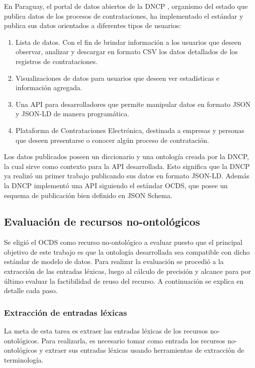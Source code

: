 En Paraguay,  el portal de datos abiertos de la DNCP \cite{DatosAbiDNCP:online}, organismo del estado que publica datos de los procesos de contrataciones, ha implementado el estándar y publica sus datos orientados a diferentes tipos de usuarios:


\begin{enumerate}
    \item Lista de datos. Con el fin de brindar información a los usuarios que deseen observar, analizar y descargar en formato CSV los datos detallados de los registros de contrataciones.
    \item Visualizaciones de datos para usuarios que deseen ver estadísticas e información agregada.
    \item Una API para desarrolladores que permite manipular datos en formato JSON y JSON-LD de manera programática.
    \item Plataforma de Contrataciones Electrónica, destinada a empresas y personas que deseen presentarse o conocer algún proceso de contratación.
\end{enumerate}

Los datos publicados poseen un diccionario y una ontología creada por la DNCP, la cual sirve como contexto para la API desarrollada. Esto significa que la DNCP ya realizó un primer trabajo publicando sus datos en formato JSON-LD. Además la DNCP implementó una API siguiendo el estándar OCDS, que posee un esquema de publicación bien definido en JSON Schema.


\subsection{Evaluación de recursos no-ontológicos}
Se eligió el OCDS como recurso no-ontológico a evaluar puesto que el principal objetivo de este trabajo es que la ontología desarrollada sea compatible con dicho estándar de modelo de datos. Para realizar la evaluación se procedió a la extracción de las entradas léxicas, luego al cálculo de precisión y alcance para por último evaluar la factibilidad de reuso del recurso.  A continuación se explica en detalle cada paso.

\subsubsection{Extracción de entradas léxicas}
La meta de esta tarea es extraer las entradas léxicas de los recursos no-ontológicos. Para realizarla, es necesario tomar como entrada los recursos no-ontológicos y extraer sus entradas léxicas usando herramientas de extracción de terminología.	
			
